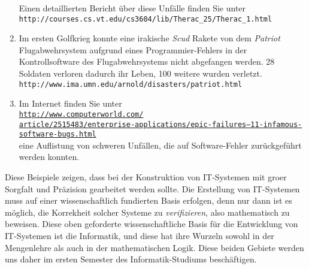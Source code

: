 \begin{enumerate}
      Einen detaillierten Bericht \"{u}ber diese Unf\"{a}lle finden Sie unter \\[0.1cm]
      \hspace*{1.3cm} \texttt{http://courses.cs.vt.edu/cs3604/lib/Therac\_25/Therac\_1.html}      
\item Im ersten Golfkrieg konnte eine irakische \textsl{Scud} Rakete von dem \textsl{Patriot} Flugabwehrsystem
      aufgrund eines Programmier-Fehlers in der Kontrollsoftware des Flugabwehrsystems
      nicht abgefangen werden.  28 Soldaten verloren dadurch ihr Leben, 100 weitere wurden
      verletzt. \\[0.1cm]
      \hspace*{1.3cm} \texttt{http://www.ima.umn.edu/arnold/disasters/patriot.html}
\item Im Internet finden Sie unter \\[0.1cm]
      \hspace*{1.3cm}
      \href{http://www.computerworld.com/article/2515483/enterprise-applications/epic-failures--11-infamous-software-bugs.html}{\texttt{http://www.computerworld.com/\\
              article/2515483/enterprise-applications/epic-failures--11-infamous-software-bugs.html}}
      \\[0.1cm]
      eine Auflistung von schweren Unf\"{a}llen, die auf Software-Fehler zur\"{u}ckgef\"{u}hrt werden konnten.
\end{enumerate}
Diese Beispiele zeigen, dass bei der Konstruktion von IT-Systemen mit gro\3er Sorgfalt
und Pr\"{a}zision gearbeitet werden sollte.  Die Erstellung von IT-Systemen muss auf einer 
wissenschaftlich fundierten Basis erfolgen, denn nur dann ist es m\"{o}glich, die Korrekheit
solcher Systeme zu \emph{verifizieren}, also mathematisch zu beweisen.
Diese oben geforderte wissenschaftliche Basis f\"{u}r die Entwicklung von IT-Systemen ist die Informatik, 
und diese hat ihre Wurzeln sowohl in der Mengenlehre als auch in der mathematischen
Logik.  Diese beiden Gebiete werden uns daher im ersten Semester
des Informatik-Studiums besch\"{a}ftigen.

